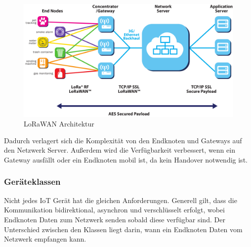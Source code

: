 \documentclass[12pt]{article}
\begin{document}
        \begin{figure}[h!]
          \center
          \includegraphics[scale = 0.17]{./img/LoRaWAN_Systemarchitektur.png}
          \caption{LoRaWAN Architektur\protect\footnotemark[1]}
        \end{figure}

        Dadurch verlagert sich die Komplexität von den Endknoten und Gateways auf den Netzwerk Server.
        Außerdem wird die Verfügbarkeit verbessert, wenn ein Gateway ausfällt oder ein Endknoten mobil ist, da kein Handover notwendig ist.\footnotemark[1]

    

      
      \subsubsection{Geräteklassen}
        Nicht jedes IoT Gerät hat die gleichen Anforderungen. Generell gilt, dass die Kommunikation bidirektional, asynchron und verschlüsselt erfolgt, wobei Endknoten Daten zum Netzwerk senden
        sobald diese verfügbar sind. Der Unterschied zwischen den Klassen liegt darin, wann ein Endknoten Daten vom Netzwerk empfangen kann.
\end{document}

